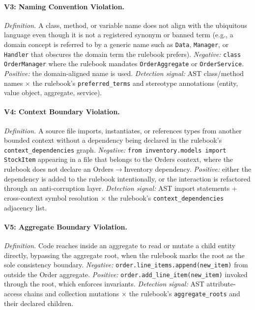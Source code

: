 \documentclass[smallextended]{svjour3}
\begin{document}
\paragraph{V3: Naming Convention Violation.}
\emph{Definition.} A class, method, or variable name does not align with the ubiquitous language even though it is not a registered synonym or banned term (e.g., a domain concept is referred to by a generic name such as \texttt{Data}, \texttt{Manager}, or \texttt{Handler} that obscures the domain term the rulebook prefers).
\emph{Negative:} \texttt{class OrderManager} where the rulebook mandates \texttt{OrderAggregate} or \texttt{OrderService}.
\emph{Positive:} the domain-aligned name is used.
\emph{Detection signal:} AST class/method names $\times$ the rulebook's \texttt{preferred\_terms} and stereotype annotations (entity, value object, aggregate, service).

\paragraph{V4: Context Boundary Violation.}
\emph{Definition.} A source file imports, instantiates, or references types from another bounded context without a dependency being declared in the rulebook's \texttt{context\_dependencies} graph.
\emph{Negative:} \texttt{from inventory.models import StockItem} appearing in a file that belongs to the Orders context, where the rulebook does not declare an Orders$\rightarrow$Inventory dependency.
\emph{Positive:} either the dependency is added to the rulebook intentionally, or the interaction is refactored through an anti-corruption layer.
\emph{Detection signal:} AST import statements + cross-context symbol resolution $\times$ the rulebook's \texttt{context\_dependencies} adjacency list.

\paragraph{V5: Aggregate Boundary Violation.}
\emph{Definition.} Code reaches inside an aggregate to read or mutate a child entity directly, bypassing the aggregate root, when the rulebook marks the root as the sole consistency boundary.
\emph{Negative:} \texttt{order.line\_items.append(new\_item)} from outside the Order aggregate.
\emph{Positive:} \texttt{order.add\_line\_item(new\_item)} invoked through the root, which enforces invariants.
\emph{Detection signal:} AST attribute-access chains and collection mutations $\times$ the rulebook's \texttt{aggregate\_roots} and their declared children.
\end{document}
